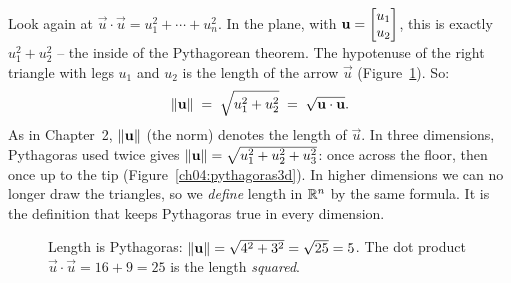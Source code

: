Look again at $\vec u\cdot\vec u = u_1^2 + \cdots + u_n^2$. In the plane, with
$\mathbf{u} = \begin{bmatrix}u_1\\u_2\end{bmatrix}$, this is exactly $u_1^2 + u_2^2$ -- the inside of the
Pythagorean theorem. The hypotenuse of the right triangle with legs $u_1$ and
$u_2$ is the length of the arrow $\vec u$ (Figure~\ref{ch04:pythagoras}). So:
\[
  \lVert\mathbf{u}\rVert \;=\; \sqrt{u_1^2 + u_2^2} \;=\; \sqrt{\mathbf{u}\cdot\mathbf{u}}.
\]
As in Chapter~2, $\lVert\mathbf{u}\rVert$ (the norm) denotes the length of $\vec u$.
In three dimensions, Pythagoras used twice gives
$\lVert\mathbf{u}\rVert=\sqrt{u_1^2+u_2^2+u_3^2}$: once across the floor, then once up to the
tip (Figure~\ref{ch04:pythagoras3d}). In higher dimensions we can no longer draw the
triangles, so we \emph{define} length in $\mathbb{R}^n$ by the same formula. It is the
definition that keeps Pythagoras true in every dimension.

\begin{figure}[htbp]
\centering
{}
\caption{Length is Pythagoras: $\lVert\mathbf{u}\rVert=\sqrt{4^2+3^2}=\sqrt{25}=5$.
The dot product $\vec u\cdot\vec u = 16+9 = 25$ is the length \emph{squared}.}
\label{ch04:pythagoras}
\end{figure}

